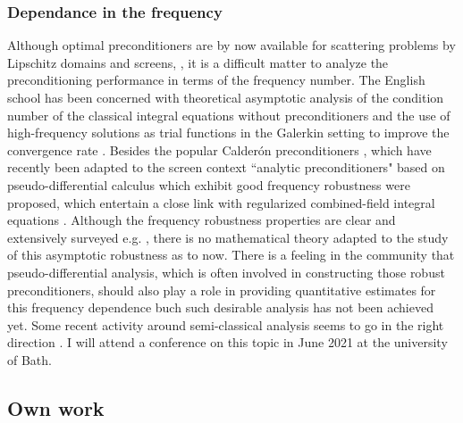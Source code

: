 \documentclass[]{article}
\begin{document}
\subsubsection*{Dependance in the frequency}

Although optimal preconditioners are by now available for scattering problems by Lipschitz domains and screens, \cite{steinbach1998construction,hiptmair2006operator}, it is a difficult matter to analyze the preconditioning performance in terms of the frequency number. The English school has been concerned with theoretical asymptotic analysis of the condition number of the classical integral equations without preconditioners \cite{chandler2020high} and the use of high-frequency solutions as trial functions in the Galerkin setting to improve the convergence rate \cite{chandlerWilde2015high}. Besides the popular Calder\'{o}n preconditioners \cite{christiansen2000preconditionneurs,christiansen2002preconditioner}, which have recently been adapted to the screen context \cite{bruno2012second}  ``analytic preconditioners" based on pseudo-differential calculus which exhibit good frequency robustness \cite{antoine2007generalized} were proposed, which entertain a close link with regularized combined-field integral equations \cite{buffa2005regularized}. Although the frequency robustness properties are clear and extensively surveyed e.g. \cite{boubendir2014well}, there is no mathematical theory adapted to the study of this asymptotic robustness as to now. There is a feeling in the community that pseudo-differential analysis, which is often involved in constructing those robust preconditioners, should also play a role in providing quantitative estimates for this frequency dependence buch such desirable analysis has not been achieved yet. Some recent activity around semi-classical analysis seems to go in the right direction \cite{galkowski2019wavenumber}. I will attend a conference on this topic in June 2021 at the university of Bath. 


\subsection*{Own work}
\end{document}
